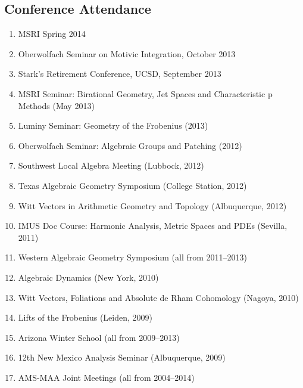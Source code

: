 \documentclass[a4paper,10pt]{article}
\begin{document}
\subsection*{Conference Attendance }
\begin{enumerate}
\item MSRI Spring 2014
\item Oberwolfach Seminar on Motivic Integration, October 2013
\item Stark's Retirement Conference, UCSD, September 2013
\item MSRI Seminar: Birational Geometry, Jet Spaces and  Characteristic p Methods (May 2013)
\item  Luminy Seminar: Geometry of the Frobenius (2013)
 \item Oberwolfach Seminar: Algebraic Groups and Patching (2012)
 \item Southwest Local Algebra Meeting (Lubbock, 2012)
 \item Texas Algebraic Geometry Symposium (College Station, 2012)
 \item Witt Vectors in Arithmetic Geometry and Topology (Albuquerque, 2012)
 \item IMUS Doc Course: Harmonic Analysis, Metric Spaces and PDEs (Sevilla, 2011)
 \item Western Algebraic Geometry Symposium (all from 2011--2013)
 \item Algebraic Dynamics (New York, 2010)
 \item Witt Vectors, Foliations and Absolute de Rham Cohomology (Nagoya, 2010)
 \item Lifts of the Frobenius (Leiden, 2009)
 \item Arizona Winter School (all from 2009--2013)
 \item 12th New Mexico Analysis Seminar (Albuquerque, 2009)
 \item AMS-MAA Joint Meetings (all from 2004--2014)
\end{enumerate}
\fi


\iffalse 
\subsection*{Teaching Experience}
\begin{itemize}\addtolength{\itemsep}{-0.5\baselineskip}
	\item Service Courses: Trigonometry, Precalculus, Calculus I, Calculus II (Large classes format), Calculus III, Business Calculus 
	\item Undergraduate: Foundations of Mathematics, Abstract Algebra, PDEs
	\item Graduate: Complex Analysis, Abstract Algebra/Commutative Algebra, Algebraic Topology
\end{itemize}
\fi
\end{document}
